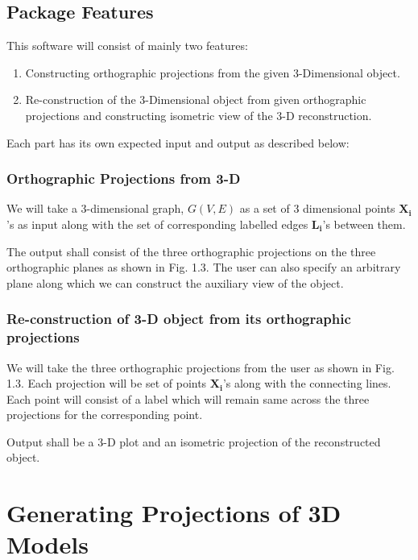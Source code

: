 \documentclass[a4paper,11pt,openany]{book}
\begin{document}
\vspace{10 mm}
\section{Package Features}
\indent This software will consist of mainly two features:
\begin{enumerate}
  \item Constructing orthographic projections from the given 3-Dimensional object.
  \item Re-construction of the 3-Dimensional object from given orthographic projections and constructing isometric view of the 3-D reconstruction.
\end{enumerate}

Each part has its own expected input and output as described below:

\subsection{Orthographic Projections from 3-D}
\indent  We will take a 3-dimensional graph, $G(V,E)$ as 
a set of 3 dimensional points $\boldsymbol{X_i}$'s as input along with the set of corresponding labelled edges $\boldsymbol{L_i}$'s between them. 

The output shall consist of the three orthographic projections on the three orthographic planes as shown in Fig. 1.3. The user can also specify an arbitrary plane along which we can construct the auxiliary view of the object.

\subsection{Re-construction of 3-D object from its orthographic projections}
We will take the three orthographic projections from the user as shown in Fig. 1.3. Each projection will be set of points $\boldsymbol{X_i}$'s along with the connecting lines. Each point will consist of a label which will remain same across the three projections for the corresponding point.

Output shall be a 3-D plot and an isometric projection of the reconstructed object.


\chapter{Generating Projections of 3D Models}
\end{document}
